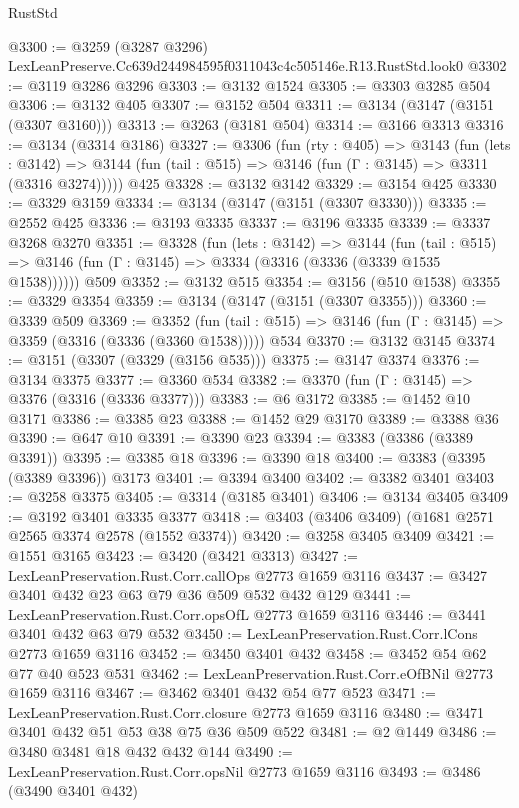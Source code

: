 \begin{lexlean}{RustStd}
\begin{coremodule}
@3300 := @3259 (@3287 @3296) LexLeanPreserve.Cc639d244984595f0311043c4c505146e.R13.RustStd.look0
@3302 := @3119 @3286 @3296
@3303 := @3132 @1524
@3305 := @3303 @3285 @504
@3306 := @3132 @405
@3307 := @3152 @504
@3311 := @3134 (@3147 (@3151 (@3307 @3160)))
@3313 := @3263 (@3181 @504)
@3314 := @3166 @3313
@3316 := @3134 (@3314 @3186)
@3327 := @3306
    (fun (rty : @405) =>
    @3143
      (fun (lets : @3142) =>
      @3144 (fun (tail : @515) => @3146 (fun (Γ : @3145) => @3311 (@3316 @3274)))))
    @425
@3328 := @3132 @3142
@3329 := @3154 @425
@3330 := @3329 @3159
@3334 := @3134 (@3147 (@3151 (@3307 @3330)))
@3335 := @2552 @425
@3336 := @3193 @3335
@3337 := @3196 @3335
@3339 := @3337 @3268 @3270
@3351 := @3328
    (fun (lets : @3142) =>
    @3144
      (fun (tail : @515) => @3146 (fun (Γ : @3145) => @3334 (@3316 (@3336 (@3339 @1535 @1538))))))
    @509
@3352 := @3132 @515
@3354 := @3156 (@510 @1538)
@3355 := @3329 @3354
@3359 := @3134 (@3147 (@3151 (@3307 @3355)))
@3360 := @3339 @509
@3369 := @3352
    (fun (tail : @515) => @3146 (fun (Γ : @3145) => @3359 (@3316 (@3336 (@3360 @1538)))))
    @534
@3370 := @3132 @3145
@3374 := @3151 (@3307 (@3329 (@3156 @535)))
@3375 := @3147 @3374
@3376 := @3134 @3375
@3377 := @3360 @534
@3382 := @3370 (fun (Γ : @3145) => @3376 (@3316 (@3336 @3377)))
@3383 := @6 @3172
@3385 := @1452 @10 @3171
@3386 := @3385 @23
@3388 := @1452 @29 @3170
@3389 := @3388 @36
@3390 := @647 @10
@3391 := @3390 @23
@3394 := @3383 (@3386 (@3389 @3391))
@3395 := @3385 @18
@3396 := @3390 @18
@3400 := @3383 (@3395 (@3389 @3396)) @3173
@3401 := @3394 @3400
@3402 := @3382 @3401
@3403 := @3258 @3375
@3405 := @3314 (@3185 @3401)
@3406 := @3134 @3405
@3409 := @3192 @3401 @3335 @3377
@3418 := @3403 (@3406 @3409) (@1681 @2571 @2565 @3374 @2578 (@1552 @3374))
@3420 := @3258 @3405 @3409
@3421 := @1551 @3165
@3423 := @3420 (@3421 @3313)
@3427 := LexLeanPreservation.Rust.Corr.callOps @2773 @1659 @3116
@3437 := @3427 @3401 @432 @23 @63 @79 @36 @509 @532 @432 @129
@3441 := LexLeanPreservation.Rust.Corr.opsOfL @2773 @1659 @3116
@3446 := @3441 @3401 @432 @63 @79 @532
@3450 := LexLeanPreservation.Rust.Corr.lCons @2773 @1659 @3116
@3452 := @3450 @3401 @432
@3458 := @3452 @54 @62 @77 @40 @523 @531
@3462 := LexLeanPreservation.Rust.Corr.eOfBNil @2773 @1659 @3116
@3467 := @3462 @3401 @432 @54 @77 @523
@3471 := LexLeanPreservation.Rust.Corr.closure @2773 @1659 @3116
@3480 := @3471 @3401 @432 @51 @53 @38 @75 @36 @509 @522
@3481 := @2 @1449
@3486 := @3480 @3481 @18 @432 @432 @144
@3490 := LexLeanPreservation.Rust.Corr.opsNil @2773 @1659 @3116
@3493 := @3486 (@3490 @3401 @432)

\end{coremodule}
\end{lexlean}
